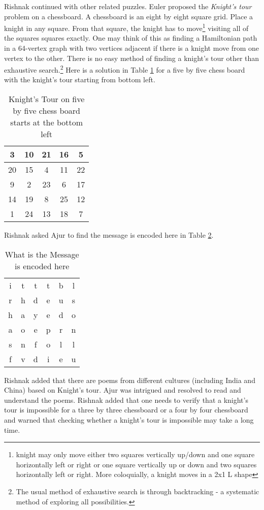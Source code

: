 Rishnak continued with other related puzzles. Euler proposed the \emph{Knight's tour} problem on a chessboard. A chessboard is an eight by eight square grid. Place a knight in any square. From that square, the knight has to move\footnote{knight may only move either two squares vertically up/down and one square horizontally left or right or one square vertically up or down and two squares horizontally left or right. More coloquially, a knight moves in a 2x1 L shape} visiting all of the squares squares exactly. One may think of this as finding a Hamiltonian path in a 64-vertex graph with two vertices adjacent if there is a knight move from one vertex to the other. There is no easy method of finding a knight's tour other than exhaustive search.\footnote{The usual method of exhaustive search is through backtracking - a systematic method of exploring all possibilities.} Here is a solution in Table \ref{5t1} for a five by five chess board with the knight's tour starting from bottom left.
\begin{table}
\centering
\begin{tabular}{|c |c |c| c| c|} 
 \hline
3&10&21&16& 5\\
\hline
20&15& 4&11&22\\
\hline
 9& 2&23& 6&17\\
 \hline
14&19& 8&25&12\\
\hline
 1&24&13&18& 7\\
 \hline
\end{tabular}
\caption{Knight's Tour on five by five chess board starts at the bottom left}
\label{5t1}
\end{table}
Rishnak asked Ajur to find the message is encoded here in Table \ref{5t2}.
\begin{table}
\centering
\begin{tabular}{c c c c cc}
i& t& t& t& b& l\\
r& h &d &e& u& s\\
h& a& y& e& d& o\\
a& o& e& p& r& n\\
s& n& f& o& l& l\\
f& v& d &i& e& u\\
\end{tabular}
\caption{What is the Message is encoded here}
\label{5t2}
\end{table}
Rishnak added that there are poems from different cultures (including India and China) based on Knight's tour. Ajur was intrigued and resolved to read and understand the poems. Rishnak added that one needs to verify that a knight's tour is impossible for a three by three chessboard or a four by four chessboard and warned that checking whether a knight's tour is impossible may take a long time.

